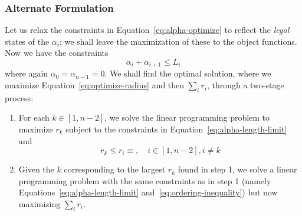 \documentclass{article}
\begin{document}
\subsubsection{Alternate Formulation}
\label{sec:alt-form}
%
Let us relax the constraints in Equation~\eqref{eq:alpha-optimize} to reflect the \emph{legal} states of the $\alpha_i$; we shall leave the maximization of these to the object functions.  Now we have the constraints
%
\begin{equation}
  \label{eq:alpha-length-limit}
  \alpha_i + \alpha_{i+1} \le L_i
\end{equation}
%
where again $\alpha_0 = \alpha_{n-1} = 0$.  We shall find the optimal solution, where we maximize Equation~\eqref{eq:optimize-radius} and then $\sum_i r_i$, through a two-stage process:
%
\begin{enumerate}
\item For each $k\in [1,n-2]$, we solve the linear programming problem to maximize $r_k$ subject to the constraints in Equation~\eqref{eq:alpha-length-limit} and
  \begin{equation}
    \label{eq:ordering-inequality}
    r_k \le r_i \equiv, \quad i \in [1,n-2], i \ne k
  \end{equation}
\item Given the $k$ corresponding to the largest $r_k$ found in step 1, we solve a linear programming problem with the same constraints as in step 1 (namely Equations~\eqref{eq:alpha-length-limit} and~\eqref{eq:ordering-inequality}) but now maximizing $\sum_i r_i$.
\end{enumerate}
%
\end{document}
